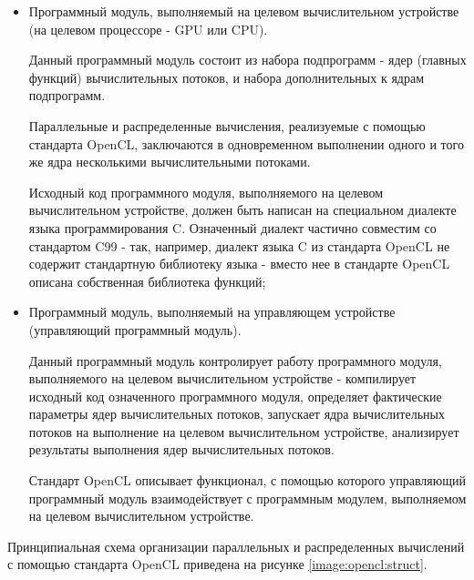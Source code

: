 \begin{itemize}

	\item Программный модуль, выполняемый на целевом вычислительном устройстве (на целевом процессоре - GPU или CPU).
	
		Данный программный модуль состоит из набора подпрограмм - ядер (главных функций) вычислительных потоков, и набора дополнительных к ядрам подпрограмм.

		Параллельные и распределенные вычисления, реализуемые с помощью стандарта \linebreak OpenCL, заключаются в одновременном выполнении одного и того же ядра несколькими вычислительными потоками.

		Исходный код программного модуля, выполняемого на целевом вычислительном устройстве, должен быть написан на специальном диалекте языка программирования C. Означенный диалект частично совместим со стандартом C99 - так, например, диалект языка C из стандарта OpenCL не содержит стандартную библиотеку языка - вместо нее в стандарте OpenCL описана собственная библиотека функций;

	\item Программный модуль, выполняемый на управляющем устройстве (управляющий программный модуль).

		Данный программный модуль контролирует работу программного модуля, выполняемого на целевом вычислительном устройстве - компилирует исходный код означенного программного модуля, определяет фактические параметры ядер вычислительных потоков, запускает ядра вычислительных потоков на выполнение на целевом вычислительном устройстве, анализирует результаты выполнения ядер вычислительных потоков.

		Стандарт OpenCL описывает функционал, с помощью которого управляющий программный модуль взаимодействует с программным модулем, выполняемом на целевом вычислительном устройстве.

\end{itemize}

Принципиальная схема организации параллельных и распределенных вычислений с помощью стандарта OpenCL приведена на рисунке \ref{image:opencl:struct}.

\begin{landscape}
~
\vfill
{}
\vfill
~
\end{landscape}

